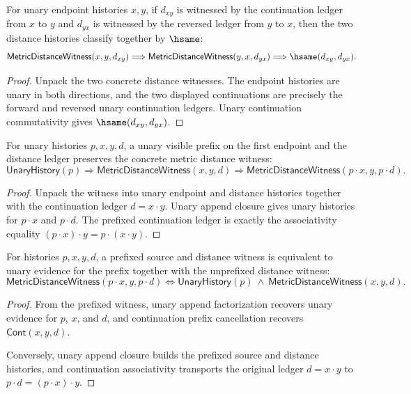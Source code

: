 \begin{theorem}
\label{thm:metric-distance-witness-symmetric-classifier}
For unary endpoint histories $x,y$, if $d_{xy}$ is witnessed by the
continuation ledger from $x$ to $y$ and $d_{yx}$ is witnessed by the reversed
ledger from $y$ to $x$, then the two distance histories classify together by
$\hsame$:
$$
\mathsf{MetricDistanceWitness}(x,y,d_{xy})
\Longrightarrow
\mathsf{MetricDistanceWitness}(y,x,d_{yx})
\Longrightarrow
\hsame(d_{xy},d_{yx}).
$$
\end{theorem}
\begin{proof}
Unpack the two concrete distance witnesses. The endpoint histories are unary in
both directions, and the two displayed continuations are precisely the forward
and reversed unary continuation ledgers. Unary continuation commutativity gives
$\hsame(d_{xy},d_{yx})$.
\end{proof}

\begin{theorem}
\label{thm:metric-distance-witness-prefix-closed}
For unary histories $p,x,y,d$, a unary visible prefix on the first endpoint
and the distance ledger preserves the concrete metric distance witness:
$$
\mathsf{UnaryHistory}(p)
\Longrightarrow
\mathsf{MetricDistanceWitness}(x,y,d)
\Longrightarrow
\mathsf{MetricDistanceWitness}(p\cdot x,y,p\cdot d).
$$
\end{theorem}
\begin{proof}
Unpack the witness into unary endpoint and distance histories together with the
continuation ledger $d=x\cdot y$. Unary append closure gives unary histories
for $p\cdot x$ and $p\cdot d$. The prefixed continuation ledger is exactly the
associativity equality $(p\cdot x)\cdot y=p\cdot(x\cdot y)$.
\end{proof}

\begin{theorem}
\label{thm:metric-distance-witness-prefix-iff}
For histories $p,x,y,d$, a prefixed source and distance witness is equivalent
to unary evidence for the prefix together with the unprefixed distance witness:
$$
\mathsf{MetricDistanceWitness}(p\cdot x,y,p\cdot d)
\Longleftrightarrow
\mathsf{UnaryHistory}(p)\ \wedge\ \mathsf{MetricDistanceWitness}(x,y,d).
$$
\end{theorem}
\begin{proof}
From the prefixed witness, unary append factorization recovers unary evidence
for $p$, $x$, and $d$, and continuation prefix cancellation recovers
$\mathsf{Cont}(x,y,d)$.

Conversely, unary append closure builds the prefixed source and distance
histories, and continuation associativity transports the original ledger
$d=x\cdot y$ to $p\cdot d=(p\cdot x)\cdot y$.
\end{proof}

